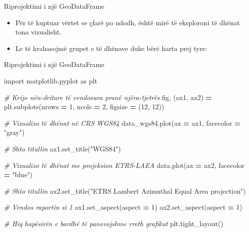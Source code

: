 \documentclass[
  ignorenonframetext,
]{beamer}
\newenvironment{Shaded}{\begin{snugshade}}{\end{snugshade}}
\newcommand{\CommentTok}[1]{\textcolor[rgb]{0.56,0.35,0.01}{\textit{#1}}}
\newcommand{\DecValTok}[1]{\textcolor[rgb]{0.00,0.00,0.81}{#1}}
\newcommand{\ImportTok}[1]{#1}
\newcommand{\NormalTok}[1]{#1}
\newcommand{\OperatorTok}[1]{\textcolor[rgb]{0.81,0.36,0.00}{\textbf{#1}}}
\newcommand{\StringTok}[1]{\textcolor[rgb]{0.31,0.60,0.02}{#1}}
\begin{document}
\begin{frame}{Riprojektimi i një GeoDataFrame}
\protect\hypertarget{riprojektimi-i-njuxeb-geodataframe-6}{}
\begin{itemize}
\item
  Për të kuptuar vërtet se çfarë po ndodh, është mirë të eksploroni të
  dhënat tona vizualisht.
\item
  Le të krahasojmë grupet e të dhënave duke bërë harta prej tyre:
\end{itemize}
\end{frame}

\begin{frame}[fragile]{Riprojektimi i një GeoDataFrame}
\protect\hypertarget{riprojektimi-i-njuxeb-geodataframe-7}{}

\begin{Shaded}
\begin{Highlighting}[]
\ImportTok{import}\NormalTok{ matplotlib.pyplot }\ImportTok{as}\NormalTok{ plt}

\CommentTok{\# Krijo nën{-}dritare të vendosura pranë njëra{-}tjetrës}
\NormalTok{fig, (ax1, ax2) }\OperatorTok{=}\NormalTok{ plt.subplots(nrows }\OperatorTok{=} \DecValTok{1}\NormalTok{, ncols }\OperatorTok{=} \DecValTok{2}\NormalTok{, figsize }\OperatorTok{=}\NormalTok{ (}\DecValTok{12}\NormalTok{, }\DecValTok{12}\NormalTok{))}

\CommentTok{\# Vizualizo të dhënat në CRS WGS84}
\NormalTok{data\_wgs84.plot(ax }\OperatorTok{=}\NormalTok{ ax1, facecolor }\OperatorTok{=} \StringTok{"gray"}\NormalTok{)}

\CommentTok{\# Shto titullin}
\NormalTok{ax1.set\_title(}\StringTok{"WGS84"}\NormalTok{)}

\CommentTok{\# Vizualizo të dhënat me projeksion ETRS{-}LAEA}
\NormalTok{data.plot(ax }\OperatorTok{=}\NormalTok{ ax2, facecolor }\OperatorTok{=} \StringTok{"blue"}\NormalTok{)}

\CommentTok{\# Shto titullin}
\NormalTok{ax2.set\_title(}\StringTok{"ETRS Lambert Azimuthal Equal Area projection"}\NormalTok{)}

\CommentTok{\# Vendos raportin si 1}
\NormalTok{ax1.set\_aspect(aspect }\OperatorTok{=} \DecValTok{1}\NormalTok{)}
\NormalTok{ax2.set\_aspect(aspect }\OperatorTok{=} \DecValTok{1}\NormalTok{)}

\CommentTok{\# Hiq hapësirën e bardhë të panevojshme rreth grafikut}
\NormalTok{plt.tight\_layout()}
\end{Highlighting}
\end{Shaded}
\end{frame}
\end{document}
